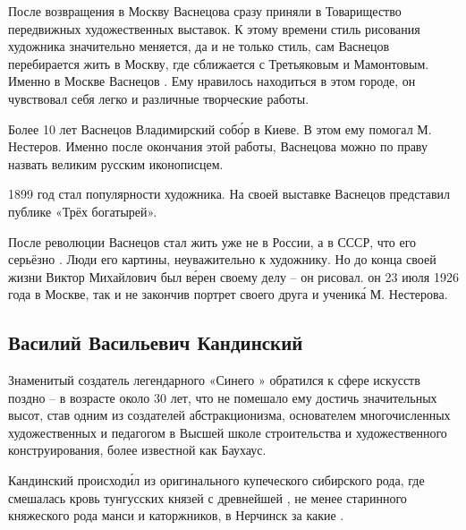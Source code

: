 После возвращения в Москву Васнецова сразу приняли в Товарищество передвижных художественных выставок. К этому времени стиль рисования художника значительно меняется, да и не только стиль, сам Васнецов перебирается жить в Москву, где сближается с Третьяковым и Мамонтовым. Именно в Москве Васнецов . Ему нравилось находиться в этом городе, он чувствовал себя легко и  различные творческие работы.

Более 10 лет Васнецов  Владимирский соб\'{о}р в Киеве. В этом ему помогал М. Нестеров. Именно после окончания этой работы, Васнецова можно по праву назвать великим русским иконописцем.

1899 год стал  популярности художника. На своей выставке Васнецов представил публике «Трёх богатырей».

После революции Васнецов стал жить уже не в России, а в СССР, что его серьёзно . Люди  его картины,  неуважительно к художнику. Но до конца своей жизни Виктор Михайлович был в\'{е}рен своему делу -- он рисовал.  он 23 июля 1926 года в Москве, так и не закончив портрет своего друга и ученик\'{а} М. Нестерова.

\subsection{Василий Васильевич Кандинский}
Знаменитый создатель легендарного «Синего » обратился к сфере искусств  поздно -- в возрасте около 30 лет, что не помешало ему достичь значительных высот, став одним из создателей абстракционизма, основателем многочисленных художественных  и педагогом в Высшей школе строительства и художественного конструирования, более известной как Баухаус.

Кандинский происход\'{и}л из оригинального купеческого сибирского рода, где  смешалась кровь тунгусских князей с древнейшей , не менее старинного княжеского рода манси и каторжников,  в Нерчинск за  какие .

